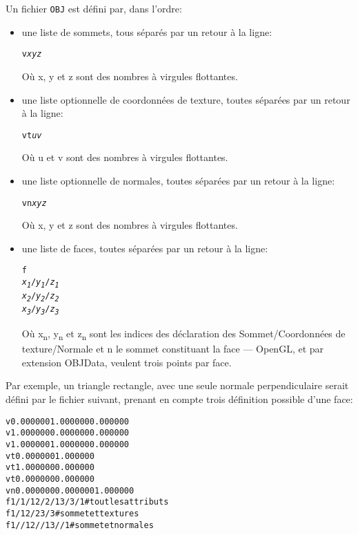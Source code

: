 \documentclass[11pt, a4paper, titlepage]{article}
\begin{document}
Un fichier \texttt{OBJ} est défini par, dans l'ordre:
\begin{itemize}

\item une liste de sommets, tous séparés par un retour à la ligne:
  \begin{alltt}
    v \emph{x} \emph{y} \emph{z}
  \end{alltt}
  Où x, y et z sont des nombres à virgules flottantes.

\item une liste optionnelle de coordonnées de texture, toutes séparées
  par un retour à la ligne:
  \begin{alltt}
    vt \emph{u} \emph{v}
  \end{alltt}
  Où u et v sont des nombres à virgules flottantes.

\item une liste optionnelle de normales, toutes séparées par un retour
  à la ligne:
  \begin{alltt}
    vn \emph{x} \emph{y} \emph{z}
  \end{alltt}
  Où x, y et z sont des nombres à virgules flottantes.

\item une liste de faces, toutes séparées par un retour à la ligne:
  \begin{alltt}
    f
    \emph{x\textsubscript{1}}/\emph{y\textsubscript{1}}/\emph{z\textsubscript{1}}
    \emph{x\textsubscript{2}}/\emph{y\textsubscript{2}}/\emph{z\textsubscript{2}}
    \emph{x\textsubscript{3}}/\emph{y\textsubscript{3}}/\emph{z\textsubscript{3}}
  \end{alltt}
  Où x\textsubscript{n}, y\textsubscript{n} et z\textsubscript{n} sont
  les indices des déclaration des Sommet/Coordonnées de
  texture/Normale et n
  le sommet constituant la face --- OpenGL, et par extension OBJData, veulent
trois points par face.
\end{itemize}

Par exemple, un triangle rectangle, avec une seule normale
perpendiculaire serait défini par le fichier suivant, prenant en
compte trois définition possible d'une face:
\begin{alltt}
v 0.000000 1.000000 0.000000 
v 1.000000 0.000000 0.000000
v 1.000000 1.000000 0.000000
vt 0.000000 1.000000
vt 1.000000 0.000000
vt 0.000000 0.000000 
vn 0.000000 0.000000 1.000000
f 1/1/1 2/2/1 3/3/1 # tout les attributs 
f 1/1 2/2 3/3       # sommet et textures
f 1//1 2//1 3//1    # sommet et normales
\end{alltt}
\end{document}
